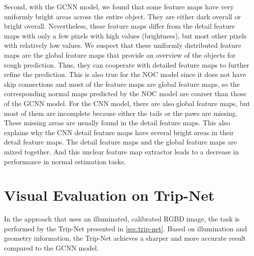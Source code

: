 Second, with the GCNN model, we found that some feature maps have very uniformly bright areas across the entire object. They are either dark overall or bright overall. Nevertheless, these feature maps differ from the detail feature maps with only a few pixels with high values (brightness), but most other pixels with relatively low values. We suspect that these uniformly distributed feature maps are the global feature maps that provide an overview of the objects for rough prediction. Thus, they can cooperate with detailed feature maps to further refine the prediction. This is also true for the NOC model since it does not have skip connections and most of the feature maps are global feature maps, so the corresponding normal maps predicted by the NOC model are coarser than those of the GCNN model. For the CNN model, there are also global feature maps, but most of them are incomplete because either the tails or the paws are missing. 
These missing areas are usually found in the detail feature maps. This also explains why the CNN detail feature maps have several bright areas in their detail feature maps. The detail feature maps and the global feature maps are mixed together. And this unclear feature map extractor leads to a decrease in performance in normal estimation tasks.




\newpage 
\section{Visual Evaluation on Trip-Net}
In the approach that uses an illuminated, calibrated RGBD image, the task is performed by the Trip-Net presented in \ref{sec:trip-net}. Based on illumination and geometry information, the Trip-Net achieves a sharper and more accurate result compared to the GCNN model.


